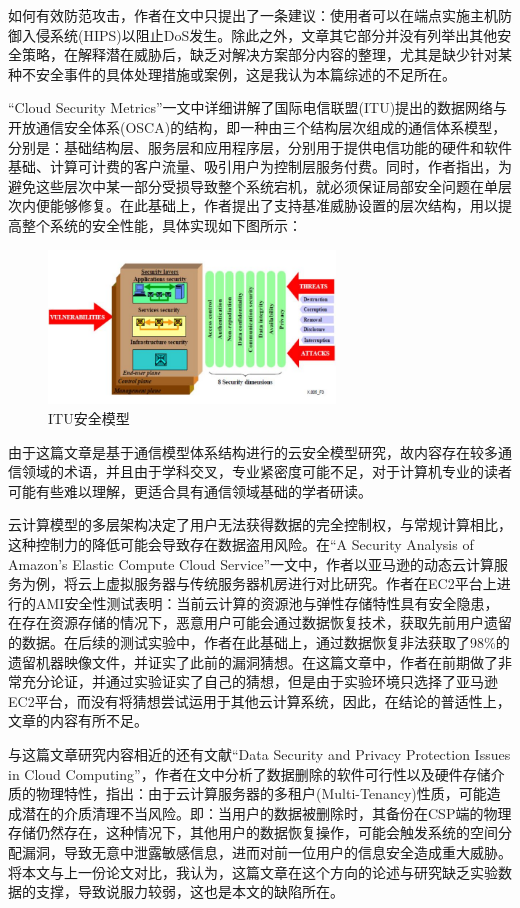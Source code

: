 \documentclass[a4paper, 12pt, conference]{ieeeconf}      %
\begin{document}
如何有效防范攻击，作者在文中只提出了一条建议：使用者可以在端点实施主机防御入侵系统(HIPS)以阻止DoS发生。除此之外，文章其它部分并没有列举出其他安全策略，在解释潜在威胁后，缺乏对解决方案部分内容的整理，尤其是缺少针对某种不安全事件的具体处理措施或案例，这是我认为本篇综述的不足所在。

“Cloud Security Metrics”一文中详细讲解了国际电信联盟(ITU)提出的数据网络与开放通信安全体系(OSCA)的结构，即一种由三个结构层次组成的通信体系模型，分别是：基础结构层、服务层和应用程序层，分别用于提供电信功能的硬件和软件基础、计算可计费的客户流量、吸引用户为控制层服务付费。同时，作者指出，为避免这些层次中某一部分受损导致整个系统宕机，就必须保证局部安全问题在单层次内便能够修复。在此基础上，作者提出了支持基准威胁设置的层次结构，用以提高整个系统的安全性能\cite{bayuk2011cloud}，具体实现如下图所示：

\begin{figure}[htbp]
\centering
\includegraphics[width=3in]{pic/图1}
\caption{ITU安全模型}
\label{fig:1}
\end{figure}

由于这篇文章是基于通信模型体系结构进行的云安全模型研究，故内容存在较多通信领域的术语，并且由于学科交叉，专业紧密度可能不足，对于计算机专业的读者可能有些难以理解，更适合具有通信领域基础的学者研读。

云计算模型的多层架构决定了用户无法获得数据的完全控制权，与常规计算相比，这种控制力的降低可能会导致存在数据盗用风险。在“A Security Analysis of Amazon’s Elastic Compute Cloud Service”一文中，作者以亚马逊的动态云计算服务为例，将云上虚拟服务器与传统服务器机房进行对比研究。作者在EC2平台上进行的AMI安全性测试表明：当前云计算的资源池与弹性存储特性具有安全隐患，在存在资源存储的情况下，恶意用户可能会通过数据恢复技术，获取先前用户遗留的数据\cite{balduzzi2012security}。在后续的测试实验中，作者在此基础上，通过数据恢复非法获取了98\%的遗留机器映像文件，并证实了此前的漏洞猜想。在这篇文章中，作者在前期做了非常充分论证，并通过实验证实了自己的猜想，但是由于实验环境只选择了亚马逊EC2平台，而没有将猜想尝试运用于其他云计算系统，因此，在结论的普适性上，文章的内容有所不足。

与这篇文章研究内容相近的还有文献“Data Security and Privacy Protection Issues in Cloud Computing”，作者在文中分析了数据删除的软件可行性以及硬件存储介质的物理特性，指出：由于云计算服务器的多租户(Multi-Tenancy)性质，可能造成潜在的介质清理不当风险\cite{chen2012data}。即：当用户的数据被删除时，其备份在CSP端的物理存储仍然存在，这种情况下，其他用户的数据恢复操作，可能会触发系统的空间分配漏洞，导致无意中泄露敏感信息，进而对前一位用户的信息安全造成重大威胁。将本文与上一份论文对比，我认为，这篇文章在这个方向的论述与研究缺乏实验数据的支撑，导致说服力较弱，这也是本文的缺陷所在。
\end{document}
